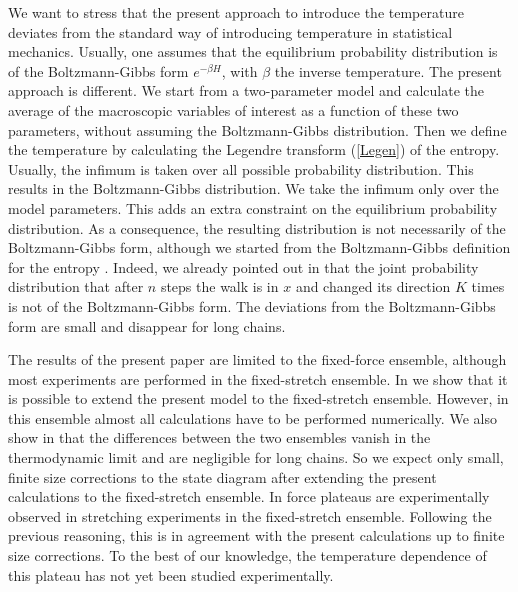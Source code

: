 \documentclass[doublecol,figures]{epl2}
\begin{document}
We want to stress that the present approach to introduce the temperature deviates from the standard way of introducing temperature in statistical mechanics. Usually, one assumes that the equilibrium probability distribution is of the Boltzmann-Gibbs form $e^{-\beta H}$, with $\beta$ the inverse temperature. The present approach is different. We start from a two-parameter model and calculate the average of the macroscopic variables of interest as a function of these two parameters, without assuming the Boltzmann-Gibbs distribution. Then we define the temperature by calculating the Legendre transform (\ref{Legen}) of the entropy. Usually, the infimum is taken over all possible probability distribution. This results in the Boltzmann-Gibbs distribution. We take the infimum only over the model parameters. This adds an extra constraint on the equilibrium probability distribution. As a consequence, the resulting distribution is not necessarily of the Boltzmann-Gibbs form, although we started from the Boltzmann-Gibbs definition for the entropy \cite{referee11}. Indeed, we already pointed out in \cite{referee9} that the joint probability distribution that after $n$ steps the walk is in $x$ and changed its direction $K$ times is not of the Boltzmann-Gibbs form. The deviations from the Boltzmann-Gibbs form are small and disappear for long chains.

The results of the present paper are limited to the fixed-force ensemble,
although most experiments are performed in the fixed-stretch ensemble. In
\cite{referee10} we show that it is possible to extend the present model to the
fixed-stretch ensemble. However, in this ensemble almost all calculations have
to be performed numerically. We also show in \cite{referee10} that the
differences between the two ensembles vanish in the thermodynamic limit
and are negligible for long chains. So we expect only small, finite size
corrections to the state diagram after extending the present calculations to the
fixed-stretch ensemble. In \cite{referee3,referee4} force plateaus are
experimentally observed in stretching experiments in the fixed-stretch ensemble.
Following the previous reasoning, this is in agreement with the present
calculations up to finite size corrections. To the best of our knowledge, the
temperature dependence of this plateau has not yet been studied experimentally.
\end{document}
